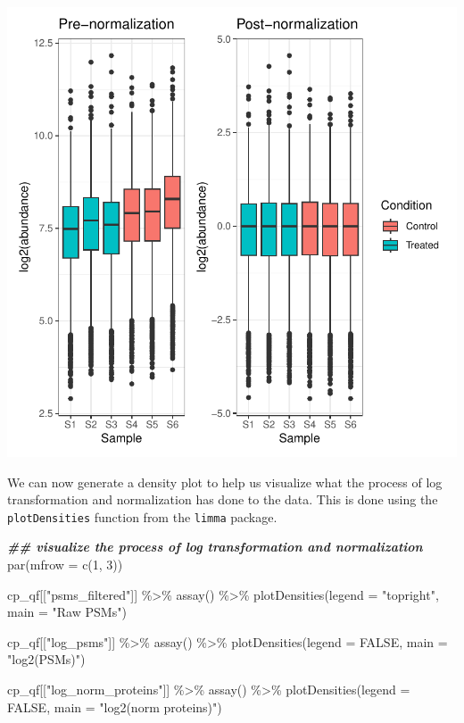 \documentclass[9pt,a4paper,]{extarticle}
\newenvironment{Shaded}{\begin{snugshade}}{\end{snugshade}}
\newcommand{\AttributeTok}[1]{\textcolor[rgb]{0.77,0.63,0.00}{#1}}
\newcommand{\ConstantTok}[1]{\textcolor[rgb]{0.00,0.00,0.00}{#1}}
\newcommand{\DecValTok}[1]{\textcolor[rgb]{0.00,0.00,0.81}{#1}}
\newcommand{\DocumentationTok}[1]{\textcolor[rgb]{0.56,0.35,0.01}{\textbf{\textit{#1}}}}
\newcommand{\FunctionTok}[1]{\textcolor[rgb]{0.00,0.00,0.00}{#1}}
\newcommand{\NormalTok}[1]{#1}
\newcommand{\SpecialCharTok}[1]{\textcolor[rgb]{0.00,0.00,0.00}{#1}}
\newcommand{\StringTok}[1]{\textcolor[rgb]{0.31,0.60,0.02}{#1}}
\begin{document}
\begin{center}\includegraphics[height=0.4\textheight]{workflow_expressions_files/figure-latex/tmt_normalization_2-1} \end{center}

We can now generate a density plot to help us visualize what the process of log
transformation and normalization has done to the data. This is done using the
\texttt{plotDensities} function from the \texttt{limma} package.

\begin{Shaded}
\begin{Highlighting}[]
\DocumentationTok{\#\# visualize the process of log transformation and normalization}
\FunctionTok{par}\NormalTok{(}\AttributeTok{mfrow =} \FunctionTok{c}\NormalTok{(}\DecValTok{1}\NormalTok{, }\DecValTok{3}\NormalTok{))}

\NormalTok{cp\_qf[[}\StringTok{"psms\_filtered"}\NormalTok{]] }\SpecialCharTok{\%\textgreater{}\%}
  \FunctionTok{assay}\NormalTok{() }\SpecialCharTok{\%\textgreater{}\%}
  \FunctionTok{plotDensities}\NormalTok{(}\AttributeTok{legend =} \StringTok{"topright"}\NormalTok{,}
                \AttributeTok{main =} \StringTok{"Raw PSMs"}\NormalTok{)}

\NormalTok{cp\_qf[[}\StringTok{"log\_psms"}\NormalTok{]] }\SpecialCharTok{\%\textgreater{}\%}
  \FunctionTok{assay}\NormalTok{() }\SpecialCharTok{\%\textgreater{}\%}
  \FunctionTok{plotDensities}\NormalTok{(}\AttributeTok{legend =} \ConstantTok{FALSE}\NormalTok{,}
                \AttributeTok{main =} \StringTok{"log2(PSMs)"}\NormalTok{)}

\NormalTok{cp\_qf[[}\StringTok{"log\_norm\_proteins"}\NormalTok{]] }\SpecialCharTok{\%\textgreater{}\%}
  \FunctionTok{assay}\NormalTok{() }\SpecialCharTok{\%\textgreater{}\%}
  \FunctionTok{plotDensities}\NormalTok{(}\AttributeTok{legend =} \ConstantTok{FALSE}\NormalTok{,}
                \AttributeTok{main =} \StringTok{"log2(norm proteins)"}\NormalTok{)}
\end{Highlighting}
\end{Shaded}
\end{document}
